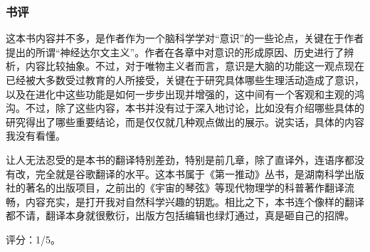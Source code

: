 \subsubsection{书评}

这本书内容并不多，是作者作为一个脑科学学对“意识”的一些论点，关键在于作者提出的所谓“神经达尔文主义”。作者在各章中对意识的形成原因、历史进行了辨析，内容比较抽象。不过，对于唯物主义者而言，意识是大脑的功能这一观点现在已经被大多数受过教育的人所接受，关键在于研究具体哪些生理活动造成了意识，以及在进化中这些功能是如何一步步出现并增强的，这中间有一个客观和主观的鸿沟。不过，除了这些内容，本书并没有过于深入地讨论，比如没有介绍哪些具体的研究得出了哪些重要结论，而是仅仅就几种观点做出的展示。说实话，具体的内容我没有看懂。

让人无法忍受的是本书的翻译特别差劲，特别是前几章，除了直译外，连语序都没有改，完全就是谷歌翻译的水平。这本书属于《第一推动》丛书，是湖南科学出版社的著名的出版项目，之前出的《宇宙的琴弦》等现代物理学的科普著作翻译流畅，内容充实，是打开我对自然科学兴趣的钥匙。相比之下，本书连个像样的翻译都不请，翻译本身就很敷衍，出版方包括编辑也绿灯通过，真是砸自己的招牌。

评分：1/5。